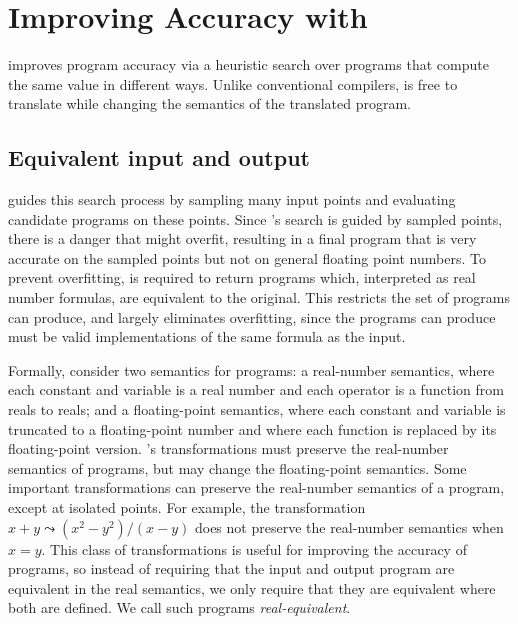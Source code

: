 \documentclass[paper.tex]{subfiles}
\begin{document}
\section{Improving Accuracy with  \casio}
\label{sec:synthesis}


\casio improves program accuracy via a heuristic search
  over programs that compute the same value in different ways.
Unlike conventional compilers, \casio is free
  to translate while changing the semantics of the translated program.

\subsection{Equivalent input and output}

\casio guides this search process by sampling many input points
  and evaluating candidate programs on these points.
Since \casio's search is guided by sampled points,
  there is a danger that \casio might overfit,
  resulting in a final program that is very accurate on the sampled points
  but not on general floating point numbers.
To prevent overfitting, \casio is required to return
  programs which, interpreted as real number formulas,
  are equivalent to the original.
This restricts the set of programs \casio can produce,
  and largely eliminates overfitting,
  since the programs \casio can produce must be valid implementations
  of the same formula as the input.

Formally, consider two semantics for programs:
  a real-number semantics,
  where each constant and variable is a real number
  and each operator is a function from reals to reals;
  and a floating-point semantics,
  where each constant and variable is truncated to a floating-point number
  and where each function is replaced by its floating-point version.
\casio's transformations must preserve the real-number semantics of programs,
  but may change the floating-point semantics.
Some important transformations
  can preserve the real-number semantics of a program,
  except at isolated points.
For example, the transformation $x + y \leadsto (x^2 - y^2)/(x - y)$
  does not preserve the real-number semantics when $x = y$.
This class of transformations is useful for improving the accuracy of programs,
  so instead of requiring that the input and output program
  are equivalent in the real semantics,
  we only require that they are equivalent where both are defined.
We call such programs \emph{real-equivalent}.
\end{document}

